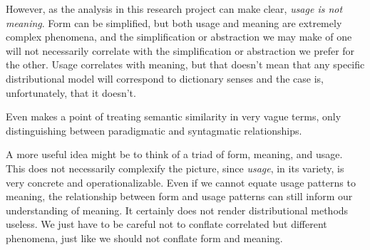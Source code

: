 \documentclass[
]{book}
\begin{document}
However, as the analysis in this research project can make clear, \emph{usage is not meaning}.
Form can be simplified, but both usage and meaning are extremely complex phenomena,
and the simplification or abstraction we may make of one will not necessarily correlate
with the simplification or abstraction we prefer for the other. Usage correlates with
meaning, but that doesn't mean that any specific distributional model will correspond
to dictionary senses and the case is, unfortunately, that it doesn't.

Even \textcite{sahlgren_2006} makes a point of treating semantic similarity in very vague terms,
only distinguishing between paradigmatic and syntagmatic relationships.

A more useful idea might be to think of a triad of form, meaning, and usage. This
does not necessarily complexify the picture, since \emph{usage}, in its variety, is very
concrete and operationalizable. Even if we cannot equate usage patterns to meaning,
the relationship between form and usage patterns can still inform our understanding of
meaning. It certainly does not render distributional methods useless. We just have
to be careful not to conflate correlated but different phenomena, just like we should
not conflate form and meaning.

\printbibliography
\end{document}
